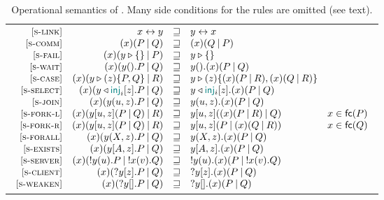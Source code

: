 \begin{table}[t]
    \caption{Operational semantics of \Calculus. Many side conditions for the
     rules are omitted (see text).}
    \label{tab:semantics}
    \begin{tabular}{@{}c@{}}
        \begin{math}
            \displaystyle
            \begin{array}{rrcll}
            \SLink &
            \Link\x\y & \pcong & \Link\y\x
            \\
            \SComm &
            \Cut\x{P}{Q} & \pcong & \Cut\x{Q}{P}
            \\
            \SFail &
            \Cut\x{\Fail\y}{P} & \pcong & \Fail\y %
            \\
            \SWait &
            \Cut\x{\Wait\y.P}{Q} & \pcong & \Wait\y.\Cut\x{P}{Q} %
            \\
            \SCase &
            \Cut\x{\Case\y\z{P}{Q}}{R} & \pcong & \Case\y\z{\Cut\x{P}{R}}{\Cut\x{Q}{R}} %
            \\
            \SSelect &
            \Cut\x{\Select\y{\InTag_i}\z.P}{Q} & \pcong & \Select\y{\InTag_i}\z.\Cut\x{P}{Q} %
            \\
            \SJoin &
            \Cut\x{\Join\y\u\z.P}{Q} & \pcong & \Join\y\u\z.\Cut\x{P}{Q} %
            \\
            \SForkL &
            \Cut\x{\Fork\y\u\z{P}{Q}}{R} & \pcong & \Fork\y\u\z{\Cut\x{P}{R}}{Q} & x \in \fn{P}
            \\
            \SForkR &
            \Cut\x{\Fork\y\u\z{P}{Q}}{R} & \pcong & \Fork\y\u\z{P}{\Cut\x{Q}{R}} & x \in \fn{Q} %
            \\
            \SForall &
            \Cut\x{\Forall\y\X\z.P}{Q} & \pcong & \Forall\y\X\z.\Cut\x{P}{Q} %
            \\
            \SExists &
            \Cut\x{\Exists\y{A}\z.P}{Q} & \pcong & \Exists\y{A}\z.\Cut\x{P}{Q} %
            \\
            \SServer &
            \Cut\x{\Server\y\u.P}{\Server\x\v.Q} & \pcong & \Server\y\u.\Cut\x{P}{\Server\x\v.Q} %
            \\
            \SClient &
            \Cut\x{\Client\y\z.P}{Q} & \pcong & \Client\y\z.\Cut\x{P}{Q} %
            \\
            \SWeaken &
            \Cut\x{\Weaken\y.P}{Q} & \pcong & \Weaken\y.\Cut\x{P}{Q} %

\end{array}
\end{math}
\end{tabular}
\end{table}
